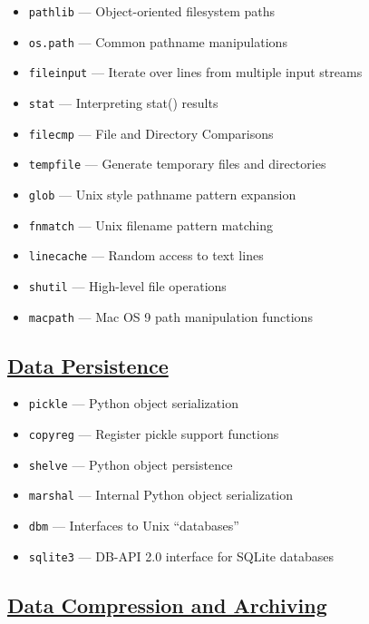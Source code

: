 \documentclass[]{book}
\providecommand{\tightlist}{%
  \setlength{\itemsep}{0pt}\setlength{\parskip}{0pt}}
\theoremstyle{definition}
\theoremstyle{definition}
\theoremstyle{definition}
\theoremstyle{remark}
\begin{document}
\begin{itemize}
\tightlist
\item
  \texttt{pathlib} --- Object-oriented filesystem paths
\item
  \texttt{os.path} --- Common pathname manipulations
\item
  \texttt{fileinput} --- Iterate over lines from multiple input streams
\item
  \texttt{stat} --- Interpreting stat() results
\item
  \texttt{filecmp} --- File and Directory Comparisons
\item
  \texttt{tempfile} --- Generate temporary files and directories
\item
  \texttt{glob} --- Unix style pathname pattern expansion
\item
  \texttt{fnmatch} --- Unix filename pattern matching
\item
  \texttt{linecache} --- Random access to text lines
\item
  \texttt{shutil} --- High-level file operations
\item
  \texttt{macpath} --- Mac OS 9 path manipulation functions
\end{itemize}

\subsection{\texorpdfstring{\href{https://docs.python.org/3.7/library/persistence.html}{Data
Persistence}}{Data Persistence}}\label{data-persistence}

\begin{itemize}
\tightlist
\item
  \texttt{pickle} --- Python object serialization
\item
  \texttt{copyreg} --- Register pickle support functions
\item
  \texttt{shelve} --- Python object persistence
\item
  \texttt{marshal} --- Internal Python object serialization
\item
  \texttt{dbm} --- Interfaces to Unix ``databases''
\item
  \texttt{sqlite3} --- DB-API 2.0 interface for SQLite databases
\end{itemize}

\subsection{\texorpdfstring{\href{https://docs.python.org/3.7/library/archiving.html}{Data
Compression and
Archiving}}{Data Compression and Archiving}}\label{data-compression-and-archiving}
\end{document}
